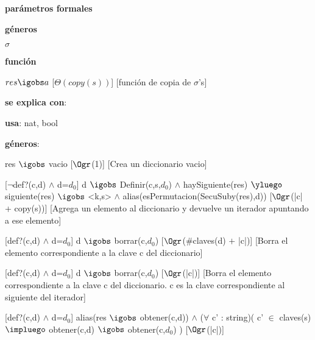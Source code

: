 \begin{Interfaz}

	\textbf{parámetros formales}\parindent\\
	\parbox{1.7cm}{\textbf{géneros}} $\sigma$\\
	\parbox[t]{1.7cm}{\textbf{función}}\parbox[t]{\textwidth-2\parindent-1.7cm}{%
	    	{$res \igobs a$}
		[$\Theta(copy(s))$]
		[función de copia de $\sigma$'s]
	}
	
	\textbf{se explica con}: 
	
	\textbf{usa}: nat, bool
	
	\textbf{géneros}: 
	
	
	{res $\igobs$ vacio}
	[$\Ogr$(1)]
	[Crea un diccionario vacio]
	
	[$\neg$def?(c,d) $\land$ d=$d_0$]
	{d $\igobs$ Definir(c,s,$d_0$) $\land$ haySiguiente(res) $\yluego$ siguiente(res) $\igobs$ <k,s> $\land$ alias(esPermutacion(SecuSuby(res),d))}
	[$\Ogr$(|c| + copy(s))]
	[Agrega un elemento al diccionario y devuelve un iterador apuntando a ese elemento]	
	
	[def?(c,d) $\land$ d=$d_0$]
	{d $\igobs$ borrar(c,$d_0$)}
	[$\Ogr$($\#$claves(d) $+$ |c|)]
	[Borra el elemento correspondiente a la clave c del diccionario]
	
	[def?(c,d) $\land$ d=$d_0$]
	{d $\igobs$ borrar(c,$d_0$)}
	[$\Ogr$(|c|)]
	[Borra el elemento correspondiente a la clave c del diccionario. c es la clave correspondiente al siguiente del iterador]
	
	[def?(c,d) $\land$ d=$d_0$]
	{alias(res $\igobs$ obtener(c,d)) $\land$ ($\forall$ c' : string)( c' $\in$ claves(s) $\impluego$ obtener(c,d) $\igobs$ obtener(c,$d_0$) )}
	[$\Ogr$(|c|)]
	
\end{Interfaz}

